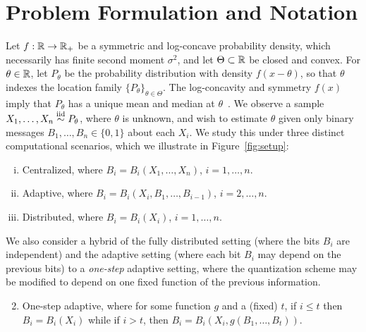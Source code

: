 
\section{Problem Formulation and Notation}
\label{sec:problem}

Let $f : \mathbb{R} \to \mathbb{R}_+$ be a symmetric and log-concave probability density,
which necessarily has finite second moment $\sigma^2$, and let $\Theta
\subset \mathbb{R}$ be closed and convex.  For $\theta \in \mathbb{R}$, let $P_\theta$ be
the probability distribution with density $f(x-\theta)$, so that $\theta$
indexes the location family $\{P_\theta\}_{\theta \in \Theta}$.  The
log-concavity and symmetry $f(x)$ imply that $P_\theta$ has a unique mean
and median at $\theta$~\cite{ibragimov1956composition}.
We observe a sample $X_1, \ldots, X_n \stackrel{\textup{iid}}{\sim} P_\theta$, where $\theta$
is unknown, and wish to estimate $\theta$ given only binary
messages $B_1, \ldots, B_n \in \{0, 1\}$ about each $X_i$.
We study this under three distinct computational scenarios, which
we illustrate in Figure~\ref{fig:setup}:
\begin{enumerate}[(i)]
\item \label{item:centralized} Centralized, where $B_i =
  B_i(X_1,\ldots,X_n)$, $i=1,\ldots,n$.
\item \label{item:adaptive} Adaptive, where $B_i =
  B_i(X_i,B_1,\ldots,B_{i-1})$, $i=2,\ldots,n$.
\item \label{item:distributed}
  Distributed, where $B_i = B_i(X_i)$, $i=1,\ldots,n$.
\end{enumerate}
\noindent
We also consider a hybrid of the fully distributed setting (where the bits
$B_i$ are independent) and the adaptive setting (where each bit $B_i$ may
depend on the previous bits) to a \emph{one-step} adaptive setting, where
the quantization scheme may be modified to depend on one fixed function of
the previous information.
\begin{enumerate}[(i')]
\setcounter{enumi}{1}
\item \label{item:one-step-adaptive}
  One-step adaptive, where for some function $g$ and
  a (fixed) $t$, if $i \le t$ then
  $B_i = B_i(X_i)$ while if $i > t$, then
  $B_i = B_i(X_i, g(B_1, \ldots, B_t))$.
\end{enumerate}

